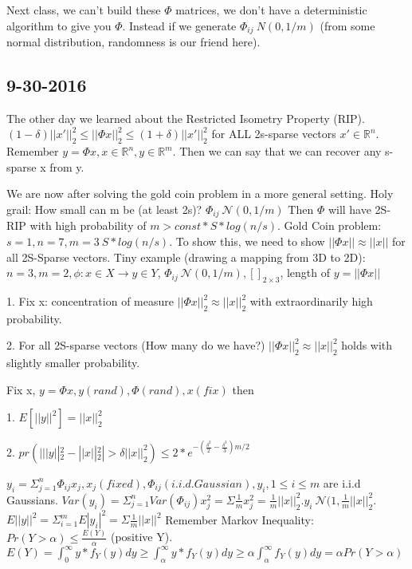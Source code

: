 \documentclass[12pt,letterpaper]{report}
\begin{document}
Next class, we can't build these $\Phi$ matrices, we don't have a deterministic algorithm to give you $\Phi$.  Instead if we generate $\Phi_{ij} ~ N(0, 1/m)$ (from some normal distribution, randomness is our friend here).

\subsection*{9-30-2016}
The other day we learned about the Restricted Isometry Property (RIP). $(1 - \delta) ||x'||_2^2 \leq ||\Phi x||_2^2 \leq (1 + \delta) ||x'||_2^2$ for ALL 2s-sparse vectors $x' \in \mathbb{R}^n$.  Remember $y = \Phi x, x \in \mathbb{R}^n, y \in \mathbb{R}^m$.  Then we can say that we can recover any s-sparse x from y.  

We are now after solving the gold coin problem in a more general setting.  Holy grail: How small can m be (at least 2s)? $\Phi_{ij} ~ \mathcal{N}(0, 1/m)$  Then $\Phi$ will have 2S-RIP with high probability of $m > const*S*log(n/s)$.  Gold Coin problem: $s=1, n=7, m=3 ~ S*log(n/s)$. To show this, we need to show $||\Phi x|| \approx ||x||$ for all 2S-Sparse vectors.  Tiny example (drawing a mapping from 3D to 2D): $n = 3, m = 2, \phi : x \in X \rightarrow y \in Y$, $\Phi_{ij} ~ \mathcal{N}(0, 1/m), []_{2 \times 3}$, length of $y = ||\Phi x||$

1. Fix x: concentration of measure $||\Phi x||_2^2 \approx ||x||_2^2$ with extraordinarily high probability.

2. For all 2S-sparse vectors (How many do we have?) $||\Phi x||_2^2 \approx ||x||_2^2$ holds with slightly smaller probability.

Fix x, $y = \Phi x, y (rand), \Phi (rand), x (fix)$ then

1. $E[||y||^2] = ||x||_2^2$

2. $pr(| ||y||_2^2 - ||x||_2^2 | > \delta ||x||_2^2) \leq 2*e^{-(\frac{\delta^2}{2} -\frac{\delta^3}{3})m/2}$

$y_i = \Sigma_{j=1}^n \Phi_{ij} x_j, x_j (fixed), \Phi_{ij} (i.i.d. Gaussian), y_i, 1 \leq i \leq m$ are i.i.d Gaussians.  $Var(y_i) = \Sigma_{j=1}^n Var(\Phi_{ij}) x_j^2 = \Sigma \frac{1}{m}x_j^2 = \frac{1}{m}||x||_2^2. y_i ~ \mathcal{N}(1, \frac{1}{m}||x||_2^2$.  $E||y||^2 = \Sigma_{i=1}^m E|y_i|^2 = \Sigma \frac{1}{m}||x||^2$  Remember Markov Inequality: $Pr(Y > \alpha) \leq \frac{E(Y)}{\alpha}$ (positive Y).  $E(Y) = \int_0^\infty y *f_Y(y)dy \geq \int_\alpha^\infty y *f_Y(y)dy \geq \alpha \int_\alpha^\infty f_Y(y)dy = \alpha Pr(Y>\alpha)$
\end{document}
